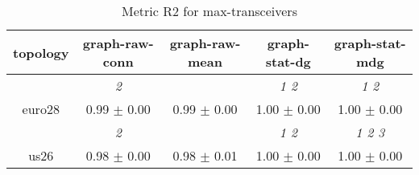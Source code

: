 \begin{table}[h]
\caption{Metric R2 for max-transceivers}

        \centering
        \begin{tabular}{
        ccccc} \toprule 
 topology& graph-raw-conn & graph-raw-mean & graph-stat-dg & graph-stat-mdg \\ \toprule
 & \cellcolor[HTML]{EFEFEF} \textit{ 2 }& \cellcolor[HTML]{EFEFEF} & \cellcolor[HTML]{EFEFEF} \textit{ 1 2 }& \cellcolor[HTML]{EFEFEF} \textit{ 1 2 } \\ 
 {euro28}& \cellcolor[HTML]{EFEFEF} 0.99 $\pm$ 0.00& \cellcolor[HTML]{EFEFEF} 0.99 $\pm$ 0.00& \cellcolor[HTML]{EFEFEF} 1.00 $\pm$ 0.00& \cellcolor[HTML]{EFEFEF} 1.00 $\pm$ 0.00 \\ 
& \cellcolor[HTML]{EFEFEF} \textit{ 2 }& \cellcolor[HTML]{EFEFEF} & \cellcolor[HTML]{EFEFEF} \textit{ 1 2 }& \cellcolor[HTML]{EFEFEF} \textit{ 1 2 3 } \\ 
 {us26}& \cellcolor[HTML]{EFEFEF} 0.98 $\pm$ 0.00& \cellcolor[HTML]{EFEFEF} 0.98 $\pm$ 0.01& \cellcolor[HTML]{EFEFEF} 1.00 $\pm$ 0.00& \cellcolor[HTML]{EFEFEF} 1.00 $\pm$ 0.00 \\ 

        \bottomrule
        \end{tabular}%

        \end{table}
        
